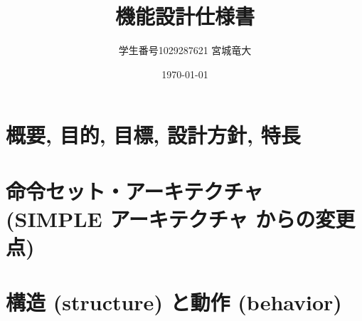 \documentclass{jsreport}
\title{機能設計仕様書}
\author{学生番号1029287621 宮城竜大}
\date{\today}
\begin{document}
\maketitle
\clearpage

\section{概要, 目的, 目標, 設計方針, 特長}

\section{命令セット・アーキテクチャ (SIMPLE アーキテクチャ からの変更点)}

\section{構造 (structure) と動作 (behavior)}
\end{document}
